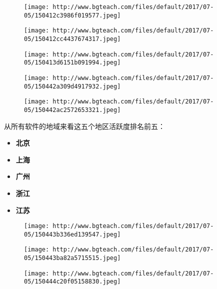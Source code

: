 \documentclass[]{article}
\begin{document}
\begin{figure}
\centering
\texttt{[image: http://www.bgteach.com/files/default/2017/07-05/150412c3986f019577.jpeg]}
\caption{}
\end{figure}

\begin{figure}
\centering
\texttt{[image: http://www.bgteach.com/files/default/2017/07-05/150412cc4437674317.jpeg]}
\caption{}
\end{figure}

\begin{figure}
\centering
\texttt{[image: http://www.bgteach.com/files/default/2017/07-05/150413d6151b091994.jpeg]}
\caption{}
\end{figure}

\begin{figure}
\centering
\texttt{[image: http://www.bgteach.com/files/default/2017/07-05/150442a309d4917932.jpeg]}
\caption{}
\end{figure}

\begin{figure}
\centering
\texttt{[image: http://www.bgteach.com/files/default/2017/07-05/150442ac2572653321.jpeg]}
\caption{}
\end{figure}

从所有软件的地域来看这五个地区活跃度排名前五：

\begin{itemize}
\item
  \textbf{北京}
\item
  \textbf{上海}
\item
  \textbf{广州}
\item
  \textbf{浙江}
\item
  \textbf{江苏}
\end{itemize}

\begin{figure}
\centering
\texttt{[image: http://www.bgteach.com/files/default/2017/07-05/150443b336ed139547.jpeg]}
\caption{}
\end{figure}

\begin{figure}
\centering
\texttt{[image: http://www.bgteach.com/files/default/2017/07-05/150443ba82a5715515.jpeg]}
\caption{}
\end{figure}

\begin{figure}
\centering
\texttt{[image: http://www.bgteach.com/files/default/2017/07-05/150444c20f05158830.jpeg]}
\caption{}
\end{figure}
\end{document}
